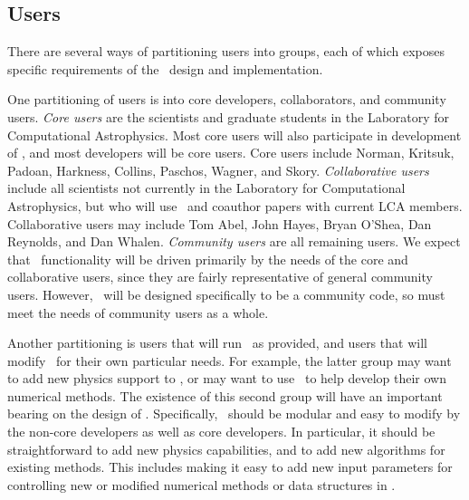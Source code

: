 \documentclass[11pt]{article}
\begin{document}
\subsection{Users}


    There are several ways of partitioning users into groups, each of
    which exposes specific requirements of the \cello\ design and
    implementation.


    One partitioning of users is into core developers,
    collaborators, and community users.
%
    \textit{Core users} are the scientists and graduate students in
    the Laboratory for Computational Astrophysics.  Most core users
    will also participate in development of \cello, and most
    developers will be core users.  Core users include Norman,
    Kritsuk, Padoan, Harkness, Collins, Paschos, Wagner, and Skory.
%
    \textit{Collaborative users} include all scientists not currently
    in the Laboratory for Computational Astrophysics, but who will use
    \cello\ and coauthor papers with current LCA members.
    Collaborative users may include Tom Abel, John Hayes, Bryan
    O'Shea, Dan Reynolds, and Dan Whalen.
%
    \textit{Community users} are all remaining users.  We expect that
    \cello\ functionality will be driven primarily by the needs of the
    core and collaborative users, since they are fairly representative
    of general community users.  However, \cello\ will be designed
    specifically to be a community code, so must meet the needs of
    community users as a whole.

    Another partitioning is users that will run \cello\ as provided,
    and users that will modify \cello\ for their own particular needs.
    For example, the latter group may want to add new physics support
    to \cello, or may want to use \cello\ to help develop their own
    numerical methods.  The existence of this second group will have
    an important bearing on the design of \cello.  Specifically,
    \cello\ should be modular and easy to modify by the non-core
    developers as well as core developers.  In particular, it should
    be straightforward to add new physics capabilities, and to add new
    algorithms for existing methods.  This includes making it easy to
    add new input parameters for controlling new or modified numerical
    methods or data structures in \cello.
\end{document}
